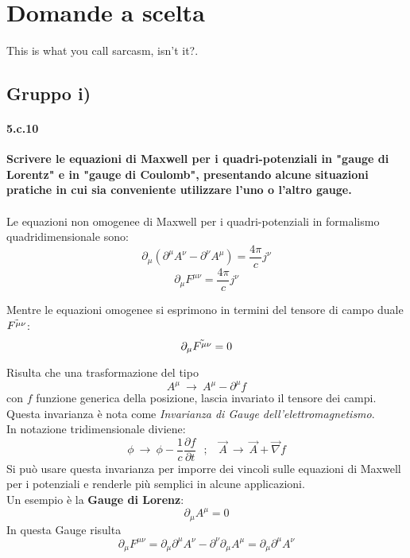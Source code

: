 \documentclass[twoside]{article}
\begin{document}
\newpage
\section{Domande a scelta}
\epigraph{This is what you call sarcasm, isn't it?.}{}
\subsection*{Gruppo i)}
\paragraph{5.c.10}\textbf{Scrivere le equazioni di Maxwell per i quadri-potenziali in "gauge di Lorentz" e in "gauge di Coulomb", presentando alcune situazioni pratiche in cui sia conveniente utilizzare l'uno o l'altro gauge.}\\
\\
Le equazioni non omogenee di Maxwell per i quadri-potenziali in formalismo quadridimensionale sono:
\begin{equation}
   \partial_{\mu}(\partial^{\mu}A^{\nu}-\partial^{\nu}A^{\mu}) =\frac{4 \pi}{c}j^{\nu} 
\end{equation}
\begin{equation}
 \partial_\mu F^{\mu \nu}=\frac{4\pi}{c}j^\nu    
\end{equation}

Mentre le equazioni omogenee si esprimono in termini del tensore di campo duale  $\Tilde{F^{\mu \nu}}$:
\begin{equation}
    \partial_{\mu}\Tilde{F^{\mu \nu}}=0
\end{equation}

Risulta che una trasformazione del tipo
\begin{equation}
    A^\mu \ \to \ A^\mu - \partial^\mu f
\end{equation}
con $f$ funzione generica della posizione, lascia invariato il tensore dei campi. Questa invarianza è nota come \textit{Invarianza di Gauge dell'elettromagnetismo}.
\\
In notazione tridimensionale diviene:
\begin{equation}
    \phi \ \to \ \phi - \frac{1}{c}\frac{\partial f}{\partial t} \ \ \ ; \ \ \ \ \vec{A} \ \to \ \vec{A}+\vec{\nabla}f
\end{equation}
Si può usare questa invarianza per imporre dei vincoli sulle equazioni di Maxwell per i potenziali e renderle più semplici in alcune applicazioni.
\\
Un esempio è la \textbf{Gauge di Lorenz}:
\begin{equation}
    \partial_\mu A^\mu =0
\end{equation}
In questa Gauge risulta
\begin{equation}
    \partial_\mu F^{\mu \nu}=\partial_\mu \partial^\mu A^\nu -\partial^\nu \partial_\mu A^\mu =\partial_\mu \partial^\mu A^\nu
\end{equation}
\end{document}
